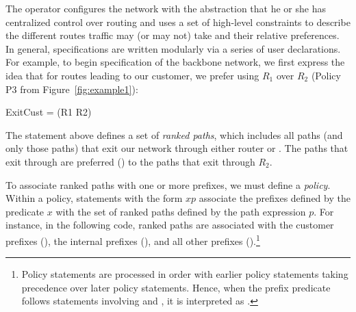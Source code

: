 The operator configures the network with the abstraction that he or she has centralized control over routing and uses a set of high-level constraints to describe the different routes traffic may (or may not) take and their relative preferences.
In general, \sysname specifications are written modularly via a series
of user declarations.
For example, to begin specification of the backbone
network, we first express the idea that for routes leading to our customer,
we prefer using $R_1$ over $R_2$ (Policy P3 from Figure~\ref{fig:example1}):
\begin{code}
\Define ExitCust = \Exit(R1 \Prefer R2)
\end{code}
The  statement above defines a set of \emph{ranked paths}, which includes
all paths (and only those paths) that exit
our network
through either router  or .  The paths that exit through 
are preferred (\Prefer) to the paths that exit through $R_2$.


To associate ranked paths with
one or more prefixes, we must define a \sysname \emph{policy}.
Within a policy, statements with the form $x$\Path$p$
associate the prefixes defined by the predicate $x$ with the set of
ranked paths defined by the path expression $p$.
For instance, in the following code, ranked paths are associated with
the customer prefixes (), the internal prefixes (),
and all other prefixes ().\footnote{Policy statements are processed in
order with earlier policy statements taking precedence over later
policy statements.  Hence, when the prefix predicate \True follows
statements involving  and , it is interpreted as
.}


